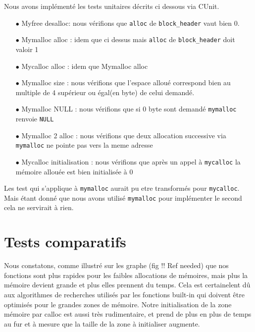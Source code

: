 \documentclass[10pt,a4paper]{article}
\begin{document}
Nous avons implémenté les tests unitaires décrits ci dessous via CUnit.
\begin{itemize}
	\item [$\bullet$] Myfree desalloc: nous vérifions que \texttt{alloc} de \texttt{block\_header} vaut bien 0.
	\item [$\bullet$] Mymalloc alloc : idem que ci dessus mais \texttt{alloc} de \texttt{block\_header} doit valoir 1
	\item [$\bullet$] Mycalloc alloc : idem que Mymalloc alloc
	\item [$\bullet$] Mymalloc size : nous vérifions que l'espace alloué correspond bien au multiple de 4 supérieur ou égal(en byte) de celui demandé.
	\item [$\bullet$] Mymalloc NULL : nous vérifions que si 0 byte sont demandé \texttt{mymalloc} renvoie \texttt{NULL}
	\item [$\bullet$] Mymalloc 2 alloc : nous vérifions que deux allocation successive via \texttt{mymalloc} ne pointe pas vers la meme adresse
	\item [$\bullet$] Mycalloc initialisation : nous vérifions que après un appel à \texttt{mycalloc} la mémoire allouée est bien initialisée à 0
\end{itemize}
Les test qui s'applique à \texttt{mymalloc} aurait pu etre transformés pour \texttt{mycalloc}. Mais étant donné que nous avons utilisé \texttt{mymalloc} pour implémenter le second cela ne servirait à rien.


\section{Tests comparatifs}

Nous constatons, comme illustré sur les graphe (fig !! Ref needed) que nos fonctions sont plus rapides pour les faibles allocations de mémoires, mais plus la mémoire devient grande et plus elles prennent du temps. Cela est certainelent dû aux algorithmes de recherches utilisés par les fonctions built-in qui doivent être optimisés pour le grandes zones de mémoire. Notre initialisation de la zone mémoire par calloc est aussi très rudimentaire, et prend de plus en plus de temps au fur et à mesure que la taille de la zone à initialiser augmente.
\end{document}
